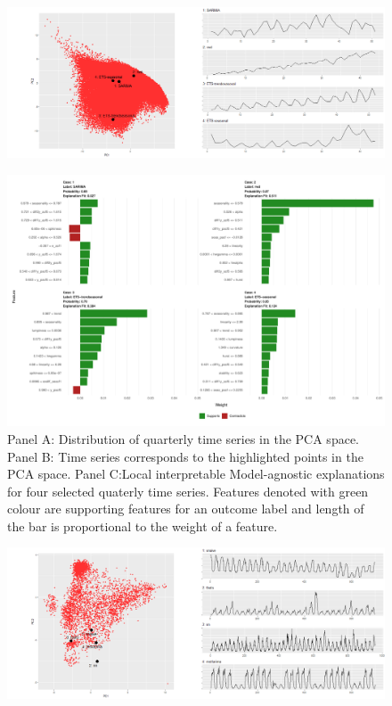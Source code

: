 \documentclass[11pt,a4paper,]{article}
\begin{document}
\begin{figure}[h]

{\centering \includegraphics{figures/quarterlylime-1} 

}

\end{figure}

\begin{figure}[h]

{\centering \includegraphics{figures/quarterlylime2-1} 

}

\caption{Panel A: Distribution of quarterly time series in the PCA space. Panel B: Time series corresponds to the highlighted points in the PCA space. Panel C:Local interpretable Model-agnostic explanations for four selected quaterly time series. Features denoted with green colour are supporting features for an outcome label and length of the bar is proportional to the weight of a feature.}\label{fig:quarterlylime2}
\end{figure}

\clearpage

\begin{figure}[h]

{\centering \includegraphics{figures/hourlylime-1} 

}

\end{figure}
\end{document}
